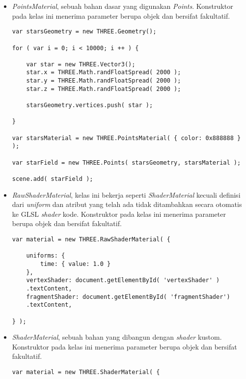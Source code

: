 \begin{itemize}
\begin{itemize}
	\item {\it PointsMaterial}, sebuah bahan dasar yang digunakan {\it Points}. Konstruktor pada kelas ini menerima parameter berupa objek dan bersifat fakultatif.
	
\begin{lstlisting}[caption={Contoh penggunaan kelas {\it PointsMaterial}.},captionpos=b]
var starsGeometry = new THREE.Geometry();

for ( var i = 0; i < 10000; i ++ ) {

	var star = new THREE.Vector3();
	star.x = THREE.Math.randFloatSpread( 2000 );
	star.y = THREE.Math.randFloatSpread( 2000 );
	star.z = THREE.Math.randFloatSpread( 2000 );

	starsGeometry.vertices.push( star );

}

var starsMaterial = new THREE.PointsMaterial( { color: 0x888888 } );

var starField = new THREE.Points( starsGeometry, starsMaterial );

scene.add( starField );
\end{lstlisting}

	\item {\it RawShaderMaterial}, kelas ini bekerja seperti {\it ShaderMaterial} kecuali definisi dari {\it uniform} dan atribut yang telah ada tidak ditambahkan secara otomatis ke GLSL {\it shader} kode. Konstruktor pada kelas ini menerima parameter berupa objek dan bersifat fakultatif.
	
\begin{lstlisting}[caption={Contoh penggunaan kelas {\it RawShaderMaterial}.},captionpos=b]
var material = new THREE.RawShaderMaterial( {

    uniforms: {
        time: { value: 1.0 }
    },
    vertexShader: document.getElementById( 'vertexShader' )
    .textContent,
    fragmentShader: document.getElementById( 'fragmentShader')
    .textContent,

} );
\end{lstlisting}

	\item {\it ShaderMaterial}, sebuah bahan yang dibangun dengan {\it shader} kustom. Konstruktor pada kelas ini menerima parameter berupa objek dan bersifat fakultatif.
	
\begin{lstlisting}[caption={Contoh penggunaan kelas {\it ShaderMaterial}.},captionpos=b]
var material = new THREE.ShaderMaterial( {


\end{lstlisting}
\end{itemize}
\end{itemize}
